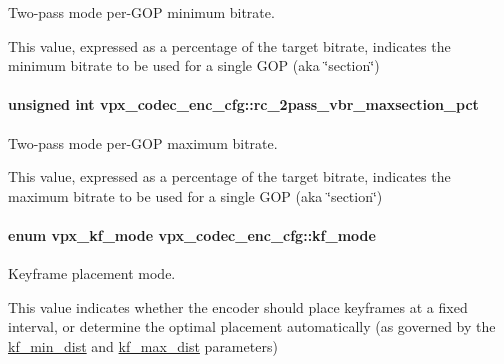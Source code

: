 Two-\/pass mode per-\/\+G\+OP minimum bitrate. 

This value, expressed as a percentage of the target bitrate, indicates the minimum bitrate to be used for a single G\+OP (aka \char`\"{}section\char`\"{}) 
\paragraph[{\texorpdfstring{rc\+\_\+2pass\+\_\+vbr\+\_\+maxsection\+\_\+pct}{rc_2pass_vbr_maxsection_pct}}]{\setlength{\rightskip}{0pt plus 5cm}unsigned int vpx\+\_\+codec\+\_\+enc\+\_\+cfg\+::rc\+\_\+2pass\+\_\+vbr\+\_\+maxsection\+\_\+pct}\hypertarget{structvpx__codec__enc__cfg_ab5212050b71b2d9f4dc663caa496949e}{}\label{structvpx__codec__enc__cfg_ab5212050b71b2d9f4dc663caa496949e}


Two-\/pass mode per-\/\+G\+OP maximum bitrate. 

This value, expressed as a percentage of the target bitrate, indicates the maximum bitrate to be used for a single G\+OP (aka \char`\"{}section\char`\"{}) 
\paragraph[{\texorpdfstring{kf\+\_\+mode}{kf_mode}}]{\setlength{\rightskip}{0pt plus 5cm}enum {\bf vpx\+\_\+kf\+\_\+mode} vpx\+\_\+codec\+\_\+enc\+\_\+cfg\+::kf\+\_\+mode}\hypertarget{structvpx__codec__enc__cfg_a491d67f061dcdb13f60c017563e9d788}{}\label{structvpx__codec__enc__cfg_a491d67f061dcdb13f60c017563e9d788}


Keyframe placement mode. 

This value indicates whether the encoder should place keyframes at a fixed interval, or determine the optimal placement automatically (as governed by the \hyperlink{structvpx__codec__enc__cfg_a0a7b5444ecb09745cbe8d5af17553846}{kf\+\_\+min\+\_\+dist} and \hyperlink{structvpx__codec__enc__cfg_ae018440136e271743376730413d25a9b}{kf\+\_\+max\+\_\+dist} parameters) 
